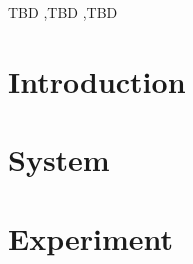 \documentclass[review,3p,authoryear]{elsarticle}
\begin{document}
\begin{frontmatter}
\title{}
\author[SMH]{Jesse~Knight}
\author[SMH]{Linwei~Wang}
\author[SMH]{Huiting~Ma}
\author[THC]{Katherine~Young}
\author[THC]{Harry~Hausler}
\author[JHU]{Sheree~Schwartz}
\author[JHU]{Stefan~Baral}
\author[SMH]{Sharmistha~Mishra}
\address[SMH]{MAP Centre for Urban Health Solutions, Unity Health Toronto}
\address[THC]{TB HIV Care, South Africa}
\address[JHU]{Dept.~Epidemiology, Johns Hopkins Bloomberg School of Public Health}
\begin{abstract}
  
\end{abstract}
\begin{keyword}
  TBD \sep TBD \sep TBD
\end{keyword}
\end{frontmatter}
\clearpage
\clearpage
\color{gray}
\section{Introduction}\label{s:intro}

\section{System}\label{s:system}

\clearpage
\color{black}
\section{Experiment}\label{s:exp}

\end{document}
